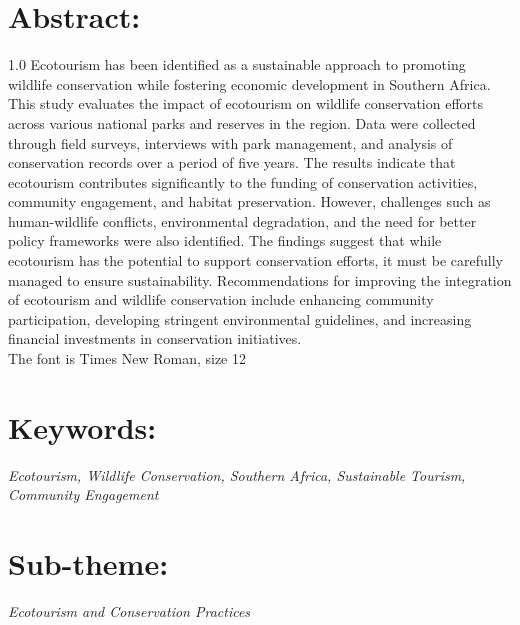 \documentclass[11pt]{article}
\begin{document}
\section*{Abstract:}
\begin{spacing}{1.0}
Ecotourism has been identified as a sustainable approach to promoting wildlife conservation while fostering economic development in Southern Africa. This study evaluates the impact of ecotourism on wildlife conservation efforts across various national parks and reserves in the region. Data were collected through field surveys, interviews with park management, and analysis of conservation records over a period of five years. The results indicate that ecotourism contributes significantly to the funding of conservation activities, community engagement, and habitat preservation. However, challenges such as human-wildlife conflicts, environmental degradation, and the need for better policy frameworks were also identified. The findings suggest that while ecotourism has the potential to support conservation efforts, it must be carefully managed to ensure sustainability. Recommendations for improving the integration of ecotourism and wildlife conservation include enhancing community participation, developing stringent environmental guidelines, and increasing financial investments in conservation initiatives. \\
The font is Times New Roman, size 12
\end{spacing}

\section*{Keywords:}
\begin{flushleft}
\textit{Ecotourism, Wildlife Conservation, Southern Africa, Sustainable Tourism, Community Engagement}
\end{flushleft}

\section*{Sub-theme:}
\begin{flushleft}
\textit{Ecotourism and Conservation Practices}
\end{flushleft}
\end{document}
